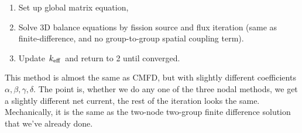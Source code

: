 \documentclass{school-22.211-notes}
\begin{document}
\begin{enumerate}
\item Set up global matrix equation,

\item Solve 3D balance equations by fission source and flux iteration (same as finite-difference, and no group-to-group spatial coupling term). 

\item Update $\left. k_{\mathrm{eff}} \right.$ and return to 2 until converged. 
\end{enumerate}
This method is almost the same as CMFD, but with slightly different coefficients $\alpha, \beta, \gamma, \delta$. The point is, whether we do any one of the three nodal methods, we get a slightly different net current, the rest of the iteration looks the same. Mechanically, it is the same as the two-node two-group finite difference solution that we've already done. 









\end{document}
